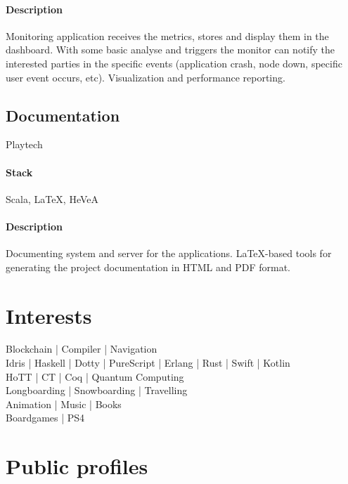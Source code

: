 \paragraph{Description}
Monitoring application receives the metrics, stores and display them in the dashboard. With some basic analyse and triggers the monitor can notify the interested parties in the specific events (application crash, node down, specific user event occurs, etc). Visualization and performance reporting.

\subsection{Documentation}
Playtech
\paragraph{Stack} Scala, LaTeX, HeVeA
\paragraph{Description}
Documenting system and server for the applications. LaTeX-based tools for generating the project documentation in HTML and PDF format.

\section{Interests}
Blockchain | Compiler | Navigation\\
Idris | Haskell | Dotty | PureScript | Erlang | Rust | Swift | Kotlin\\
HoTT | CT | Coq | Quantum Computing\\
Longboarding | Snowboarding | Travelling\\
Animation | Music | Books\\
Boardgames | PS4

\section{Public profiles}

